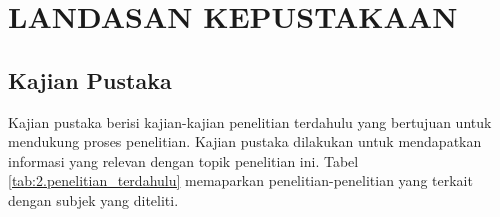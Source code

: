 
\chapter{\MakeUppercase{Landasan Kepustakaan}}

\section{Kajian Pustaka}
\label{sec:2.1}

Kajian pustaka berisi kajian-kajian penelitian terdahulu yang bertujuan
untuk mendukung proses penelitian. Kajian pustaka dilakukan untuk
mendapatkan informasi yang relevan dengan topik penelitian ini. Tabel
\ref{tab:2.penelitian_terdahulu} memaparkan penelitian-penelitian yang
terkait dengan subjek yang diteliti.


